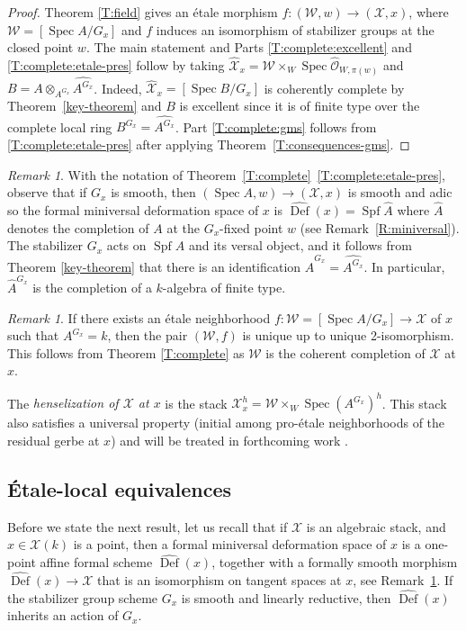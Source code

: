 \documentclass[a4paper]{amsart}
\theoremstyle{plain}
\theoremstyle{definition}
\theoremstyle{remark}
\newtheorem{remark}[theorem]{Remark}
\numberwithin{equation}{section}
\newcommand\cW{\mathcal{W}}
\newcommand\cX{\mathcal{X}}
\newcommand\oh{\mathcal{O}}
\newcommand\co{\colon}
\DeclareMathOperator{\Spec}{Spec}
\DeclareMathOperator{\Spf}{Spf}
\renewcommand{\hat}{\widehat}
\newcommand{\itemref}[1]{\eqref{#1}}
\DeclareMathOperator{\Def}{Def}
\begin{document}
\begin{proof}
Theorem \ref{T:field} gives an \'etale morphism $f \co (\cW, w) \to (\cX,x)$, where $\cW=[\Spec A/G_x]$ and $f$ induces an isomorphism of stabilizer groups at the closed point $w$.  The main statement and Parts \eqref{T:complete:excellent} and \eqref{T:complete:etale-pres} follow by taking $\hat{\cX}_x = \cW \times_W \Spec \hat{\oh}_{W,\pi(w)}$ and $B=A\otimes_{A^{G_x}} \widehat{A^{G_x}}$.
Indeed, $\hat{\cX}_x=[\Spec B/G_x]$ is coherently complete by Theorem~\ref{key-theorem} and $B$ is excellent since it is of finite type over the complete local ring $B^{G_x}=\widehat{A^{G_x}}$.  Part \eqref{T:complete:gms} follows from \eqref{T:complete:etale-pres} after applying Theorem~\ref{T:consequences-gms}.
\end{proof}

\begin{remark} \label{R:miniversal-completion-finite-type}
With the notation of Theorem~\ref{T:complete}~\itemref{T:complete:etale-pres}, observe that if $G_x$ is smooth, then $(\Spec A,w)\to (\cX,x)$ is smooth and adic so the formal miniversal deformation space of $x$ is $\hat{\Def}(x) = \Spf \hat{A}$ where $\hat{A}$ denotes the completion of $A$ at the $G_x$-fixed point $w$ (see Remark~\ref{R:miniversal}).  The stabilizer $G_x$ acts on $\Spf \hat{A}$ and its versal object, and it follows from Theorem \ref{key-theorem} that there is an identification $\hat{A}^{G_x} = \widehat{A^{G_x}}$. In particular, $\hat{A}^{G_x}$ is the completion of a $k$-algebra of finite type.
\end{remark}

\begin{remark} \label{R:uniqueness}
If there exists an \'etale neighborhood $f \co \cW=[\Spec A/G_x] \to \cX$ of $x$ such that $A^{G_x} = k$, then the pair $(\cW, f)$ is unique up to unique 2-isomorphism.   This follows from Theorem \ref{T:complete} as $\cW$ is the coherent completion of $\cX$ at $x$. 
\end{remark}


The \emph{henselization of $\cX$ at $x$} is the stack
$\cX^h_x=\cW\times_W \Spec (A^{G_x})^h$. This stack also satisfies a
universal property (initial among pro-\'etale neighborhoods of the residual
gerbe at $x$) and will be treated in forthcoming work \cite{ahr2}.


\subsection{\'Etale-local equivalences}  \label{A:etale}
Before we state the next result, let us recall that if $\cX$ is an algebraic stack, and $x \in \cX(k)$ is a point, then a formal miniversal deformation space of $x$ is a one-point affine formal scheme $\hat{\Def}(x)$, together with a formally smooth morphism $\hat{\Def}(x) \to \cX$ that is an isomorphism on tangent spaces at $x$, see Remark~\ref{R:miniversal-completion-finite-type}.  If the stabilizer group scheme $G_x$ is smooth and linearly reductive, then $\hat{\Def}(x)$ inherits an action of $G_x$.
\end{document}
